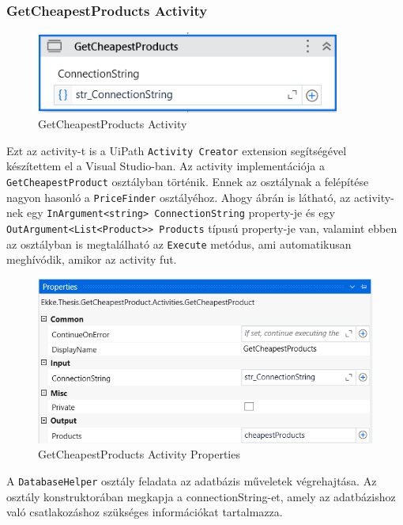 \documentclass[
]{thesis-ekf}
\theoremstyle{definition}
\theoremstyle{remark}
\begin{document}
\subsubsection*{GetCheapestProducts Activity}
\begin{figure}[!ht]
	\centering
	\includegraphics[width=10cm]{GetCheapestProducts}
	\caption{ GetCheapestProducts Activity}
	\label{picture-GetCheapestProducts}
\end{figure}

Ezt az activity-t is a UiPath \texttt{Activity Creator} extension segítségével készítettem el a Visual Studio-ban. Az activity implementációja a \texttt{GetCheapestProduct} osztályban történik. Ennek az osztálynak a felépítése nagyon hasonló a \texttt{PriceFinder} osztályéhoz. Ahogy  ábrán is látható, az activity-nek egy \texttt{InArgument<string> ConnectionString} property-je és egy \texttt{OutArgument<List<Product>}\texttt{> Products} típusú property-je van, valamint ebben az osztályban is megtalálható az \texttt{Execute} metódus, ami automatikusan meghívódik, amikor az activity fut.

\begin{figure}[!ht]
	\centering
	\includegraphics[width=14cm]{property}
	\caption{ GetCheapestProducts Activity Properties}
	\label{picture-Property}
\end{figure}

A \texttt{DatabaseHelper} osztály feladata az adatbázis műveletek végrehajtása. Az osztály konstruktorában megkapja a connectionString-et, amely az adatbázishoz való csatlakozáshoz szükséges információkat tartalmazza. 
\end{document}
